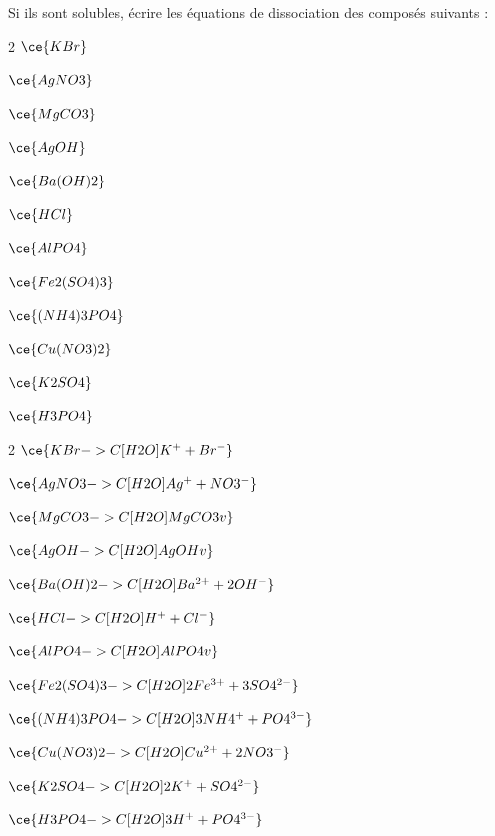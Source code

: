 \documentclass[
  11pt,
  a4paper,
  openany]{book}
\begin{document}
\begin{Exercise}

Si ils sont solubles, écrire les équations de dissociation des composés suivants :

\begin{multicols}{2}
\(\ce{KBr}\)

\(\ce{AgNO3}\)

\(\ce{MgCO3}\)

\(\ce{AgOH}\)

\(\ce{Ba(OH)2}\)

\(\ce{HCl}\)

\(\ce{AlPO4}\)

\(\ce{Fe2(SO4)3}\)

\(\ce{(NH4)3PO4}\)

\(\ce{Cu(NO3)2}\)

\(\ce{K2SO4}\)

\(\ce{H3PO4}\)

\end{multicols}

\end{Exercise}

\begin{Answer}

\begin{multicols}{2}
\(\ce{KBr ->C[H2O] K^{+} + Br^{-} }\)

\(\ce{AgNO3 ->C[H2O] Ag^{+} + NO3^{-} }\)

\(\ce{MgCO3 ->C[H2O] MgCO3 v }\)

\(\ce{AgOH ->C[H2O] AgOH v }\)

\(\ce{Ba(OH)2 ->C[H2O] Ba^{2+} + 2OH^{-} }\)

\(\ce{HCl ->C[H2O] H^{+} + Cl^{-}}\)

\(\ce{AlPO4 ->C[H2O] AlPO4 v }\)

\(\ce{Fe2(SO4)3 ->C[H2O] 2Fe^{3+} + 3SO4^{2-} }\)

\(\ce{(NH4)3PO4 ->C[H2O] 3NH4^{+} + PO4^{3-} }\)

\(\ce{Cu(NO3)2 ->C[H2O] Cu^{2+} + 2NO3^{-} }\)

\(\ce{K2SO4 ->C[H2O] 2K^{+} + SO4^{2-} }\)

\(\ce{H3PO4 ->C[H2O] 3H^{+} + PO4^{3-} }\)

\end{multicols}

\end{Answer}
\end{document}
